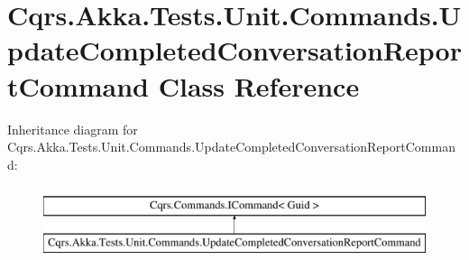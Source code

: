 \hypertarget{classCqrs_1_1Akka_1_1Tests_1_1Unit_1_1Commands_1_1UpdateCompletedConversationReportCommand}{}\section{Cqrs.\+Akka.\+Tests.\+Unit.\+Commands.\+Update\+Completed\+Conversation\+Report\+Command Class Reference}
\label{classCqrs_1_1Akka_1_1Tests_1_1Unit_1_1Commands_1_1UpdateCompletedConversationReportCommand}
Inheritance diagram for Cqrs.\+Akka.\+Tests.\+Unit.\+Commands.\+Update\+Completed\+Conversation\+Report\+Command\+:\begin{figure}[H]
\begin{center}
\leavevmode
\includegraphics[height=2.000000cm]{classCqrs_1_1Akka_1_1Tests_1_1Unit_1_1Commands_1_1UpdateCompletedConversationReportCommand}
\end{center}
\end{figure}
